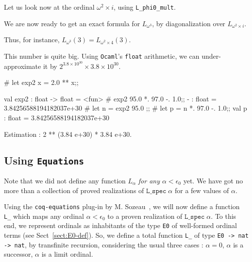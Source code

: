 


Let us look now
at the ordinal $\omega^2\times i$, using \texttt{L\_phi0\_mult}.




We are now ready to get an exact formula for $L_{\omega^3}$, by diagonalization over $L_{\omega^2\times i}$.




Thus, for instance, $L_{\omega^3}(3)=L_{\omega^2\times 4}(3)$.




This number is quite big. Using \texttt{Ocaml}'s \texttt{float} arithmetic,
we can under-approximate it by $2^{3.8\times10^{30}}\times 3.8\times{10^{30}}$.

\begin{Coqsrc}
# let exp2 x = 2.0 ** x;;

val exp2 : float -> float = <fun>
#   exp2 95.0 *. 97.0 -. 1.0;;
- : float = 3.84256588194182037e+30
# let n = exp2 95.0 ;;
# let p = n *. 97.0 -. 1.0;;
val p : float = 3.84256588194182037e+30

Estimation :
2 ** (3.84 e+30) * 3.84 e+30.
\end{Coqsrc}


\subsection{Using \texttt{Equations}}
\label{sect:L-equations}

Note that we did not define any function $L_\alpha$ \emph{for any $\alpha<\epsilon_0$} yet. We have got no more than a collection of proved realizations of $\texttt{L\_spec}\;\alpha$ for a few values of $\alpha$.


Using the \texttt{coq-equations} plug-in by 
M. Sozeau~\cite{sozeau:hal-01671777}, we will now define a function \texttt{L\_} which maps any ordinal  $\alpha<\epsilon_0$ to a proven realization of 
$\texttt{L\_spec}\;\alpha$.   
To this end, we represent ordinals as inhabitants of the type 
\texttt{E0} of well-formed ordinal terms (see Sect~\vref{sect:E0-def}). So, we define a total function \texttt{L\_} of type
\texttt{E0 -> nat -> nat}, by transfinite recursion, considering the usual three cases : $\alpha=0$, $\alpha$ is a successor, $\alpha$ is a limit ordinal.
 

